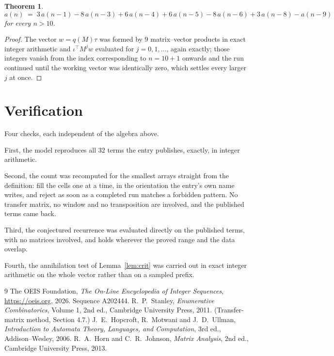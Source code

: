 \documentclass[11pt,a4paper]{article}
\theoremstyle{plain}
\newtheorem{theorem}{Theorem}
\theoremstyle{definition}
\begin{document}
\begin{theorem}
\[
a(n)\;=\;3\,a(n-1) - 8\,a(n-3) + 6\,a(n-4) + 6\,a(n-5) - 8\,a(n-6) + 3\,a(n-8) - a(n-9)
\]
for every $n>10$.
\end{theorem}

\begin{proof}
The vector $w=q(M)\tau$ was formed by $9$ matrix--vector products in exact integer
arithmetic and $\iota^{\!\top}M^{j}w$ evaluated for $j=0,1,\dots$, again exactly; those
integers vanish from the index corresponding to $n=10+1$ onwards and the run continued
until the working vector was identically zero, which settles every larger $j$ at once.
\end{proof}

\section{Verification}

Four checks, each independent of the algebra above.

First, the model reproduces all $32$ terms the entry publishes, exactly, in integer
arithmetic.

Second, the count was recomputed for the smallest arrays straight from the definition: fill the
cells one at a time, in the orientation the entry's own name writes, and reject as soon as a
completed run matches a forbidden pattern. No transfer matrix, no window and no transposition
are involved, and the published terms came back.

Third, the conjectured recurrence was evaluated directly on the published terms, with no
matrices involved, and holds wherever the proved range and the data overlap.

Fourth, the annihilation test of Lemma~\ref{lem:crit} was carried out in exact integer
arithmetic on the whole vector rather than on a sampled prefix.

\begin{thebibliography}{9}
 The OEIS Foundation, \emph{The On-Line Encyclopedia of Integer
Sequences}, \url{https://oeis.org}, 2026. Sequence A202444.
 R.~P.~Stanley, \emph{Enumerative Combinatorics}, Volume 1, 2nd ed.,
Cambridge University Press, 2011. (Transfer-matrix method, Section 4.7.)
 J.~E.~Hopcroft, R.~Motwani and J.~D.~Ullman, \emph{Introduction to Automata
Theory, Languages, and Computation}, 3rd ed., Addison--Wesley, 2006.
 R.~A.~Horn and C.~R.~Johnson, \emph{Matrix Analysis}, 2nd ed., Cambridge
University Press, 2013.
\end{thebibliography}
\end{document}
